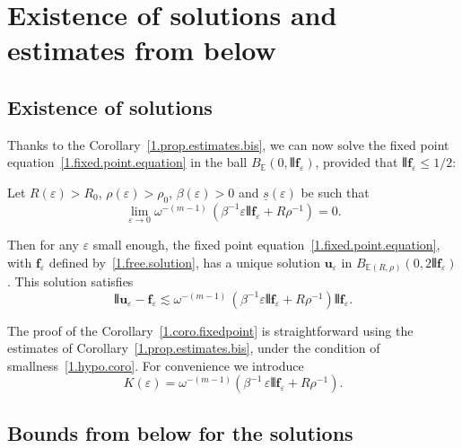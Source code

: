 \documentclass[AHL,Unicode,longabstracts,published]{cedram}
\theoremstyle{plain}
\newcommand*\e{\varepsilon}
\newcommand*\EE{{\mathbb E}}
\newcommand{\ubf}{{\mathbf u}}
\newcommand*\f{{\mathbf f}}
\newcommand*\und{\underline}
\DeclarePairedDelimiter{\VERT}{|\mkern -1.6mu|\mkern -1.6mu|}{|\mkern -1.6mu|\mkern -1.6mu|}
\begin{document}
\section{Existence of solutions and estimates from below}\label{1.section.existence}



\subsection{Existence of solutions}

Thanks to the Corollary~\ref{1.prop.estimates.bis}, we can now solve the fixed point equation~\eqref{1.fixed.point.equation} in the ball $B_{\EE}\left(0,\VERT{\f_{\e}}\right)$, provided that $\VERT{\f_{\e}} \leq 1/2$:

\begin{coro}\label{1.coro.fixedpoint}
Let $R(\e) > R_0$, $\rho(\e) > \rho_0$, $\beta(\e) >0$ and $\und{s}(\e)$ be such that
\begin{equation}\label{1.hypo.coro}
\lim_{\e\to 0} \omega^{-(m-1)}\,\left(\beta^{-1} \e\VERT{\f_{\e}} + R\rho^{-1}\right) = 0.
\end{equation}

Then for any $\e$ small enough, the fixed point equation~\eqref{1.fixed.point.equation}, with $\f_{\e}$ defined by~\eqref{1.free.solution}, has a unique solution $\ubf_{\e}$ in $B_{\EE(R,\rho)}\left(0,2\VERT{\f_{\e}}\right)$. This solution satisfies
\begin{equation}\label{1.esti.solution}
\VERT{\ubf_{\e} - \f_{\e}} \lesssim \omega^{-(m-1)}\,\left(\beta^{-1} \e \VERT{\f_{\e}} + R\rho^{-1}\right)\VERT{\f_{\e}}.
\end{equation}
\end{coro}

The proof of the Corollary~\ref{1.coro.fixedpoint} is straightforward using the estimates of Corollary~\ref{1.prop.estimates.bis}, under the condition of smallness~\eqref{1.hypo.coro}. For convenience we introduce
\begin{equation}\label{1.def.K_epsilon}
K(\e) = \omega^{-(m-1)}\left(\beta^{-1} \, \e \VERT{\f_{\e}} + R\rho^{-1}\right).
\end{equation}



\subsection{Bounds from below for the solutions}\label{1.subsection.below}
\end{document}
